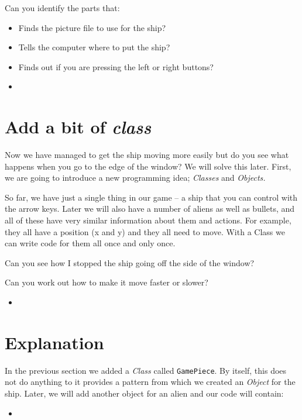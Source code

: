 \documentclass[12pt]{article}
\newcommand{\pythonscript}[2]{
\needspace{.125\textheight}
\begin{itemize}
\item[]
\end{itemize}
}
\newenvironment{hint}{
  \begin{tcolorbox}[colback=green!5,colframe=green!40!black,title=Note]}
{\end{tcolorbox}}
\begin{document}
\begin{hint}
Can you identify the parts that:

\begin{itemize}
  \item Finds the picture file to use for the ship?
  \item Tells the computer where to put the ship?
  \item Finds out if you are pressing the left or right buttons?
\end{itemize}
\end{hint}

\pythonscript{controls}{Controlling the ship}

\section{Add a bit of \emph{class}}

Now we have managed to get the ship moving more easily but do you see what
happens when you go to the edge of the window? We will solve this later.
First, we are going to introduce a new
programming idea; \emph{Classes} and \emph{Objects.}

So far, we have just a single thing in our game -- a ship that you can control
with the arrow keys. Later we will also have a number of aliens as well as
bullets, and all of these have very similar information about them and actions.
For example, they all have a position (x and y) and they all need to move.
With a Class we can write code for them all once and only once.

\begin{hint}
Can you see how I stopped the ship going off the side of the window?

Can you work out how to make it move faster or slower?
\end{hint}

\pythonscript{classes}{Adding classes}

\section{Explanation}

In the previous section we added a \emph{Class} called \texttt{GamePiece}.
By itself, this does not do anything to it provides a pattern from which
we created an \emph{Object} for the ship. Later, we will add another object
for an alien and our code will contain:

\pythonscript{explanation1}{Object creation example}
\end{document}
